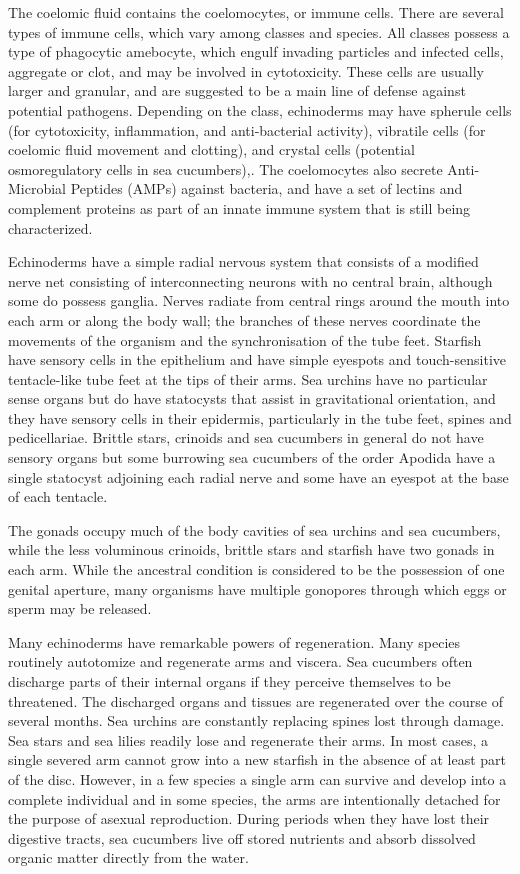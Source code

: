 The coelomic fluid contains the coelomocytes, or immune cells. There are several types of immune cells, which vary among classes and species. All classes possess a type of phagocytic amebocyte, which engulf invading particles and infected cells, aggregate or clot, and may be involved in cytotoxicity. These cells are usually larger and granular, and are suggested to be a main line of defense against potential pathogens. Depending on the class, echinoderms may have spherule cells (for cytotoxicity, inflammation, and anti-bacterial activity), vibratile cells (for coelomic fluid movement and clotting), and crystal cells (potential osmoregulatory cells in sea cucumbers),. The coelomocytes also secrete Anti-Microbial Peptides (AMPs) against bacteria, and have a set of lectins and complement proteins as part of an innate immune system that is still being characterized.

Echinoderms have a simple radial nervous system that consists of a modified nerve net consisting of interconnecting neurons with no central brain, although some do possess ganglia. Nerves radiate from central rings around the mouth into each arm or along the body wall; the branches of these nerves coordinate the movements of the organism and the synchronisation of the tube feet. Starfish have sensory cells in the epithelium and have simple eyespots and touch-sensitive tentacle-like tube feet at the tips of their arms. Sea urchins have no particular sense organs but do have statocysts that assist in gravitational orientation, and they have sensory cells in their epidermis, particularly in the tube feet, spines and pedicellariae. Brittle stars, crinoids and sea cucumbers in general do not have sensory organs but some burrowing sea cucumbers of the order Apodida have a single statocyst adjoining each radial nerve and some have an eyespot at the base of each tentacle.

The gonads occupy much of the body cavities of sea urchins and sea cucumbers, while the less voluminous crinoids, brittle stars and starfish have two gonads in each arm. While the ancestral condition is considered to be the possession of one genital aperture, many organisms have multiple gonopores through which eggs or sperm may be released.

Many echinoderms have remarkable powers of regeneration. Many species routinely autotomize and regenerate arms and viscera. Sea cucumbers often discharge parts of their internal organs if they perceive themselves to be threatened. The discharged organs and tissues are regenerated over the course of several months. Sea urchins are constantly replacing spines lost through damage. Sea stars and sea lilies readily lose and regenerate their arms. In most cases, a single severed arm cannot grow into a new starfish in the absence of at least part of the disc. However, in a few species a single arm can survive and develop into a complete individual and in some species, the arms are intentionally detached for the purpose of asexual reproduction. During periods when they have lost their digestive tracts, sea cucumbers live off stored nutrients and absorb dissolved organic matter directly from the water.

